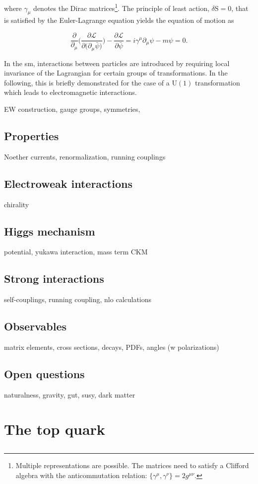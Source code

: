 where $\gamma_\mu$ denotes the Dirac matrices\footnote{Multiple representations are possible. The matrices need to satisfy a Clifford algebra with the anticommutation relation: $\big\{\gamma^\mu,\gamma^\nu\big\}=2g^{\mu\nu}$.}. The principle of least action, $\delta \mathrm{S}=0$, that is satisfied by the Euler-Lagrange equation yields the equation of motion as

\begin{equation}
\frac{\partial}{\partial_\mu}\Bigg(\frac{\partial\mathcal{L}}{\partial\big(\partial_\mu\bar{\psi}\big)}\Bigg)-\frac{\partial\mathcal{L}}{\partial\bar{\psi}}=i\gamma^\mu\partial_\mu\psi-m\psi=0.
\end{equation}


In the \gls{sm}, interactions between particles are introduced by requiring local invariance of the Lagrangian for certain groups of transformations. In the following, this is briefly demonstrated for the case of a $\mathrm{U(1)}$ transformation which leads to electromagnetic interactions.


EW construction, gauge groups, symmetries, 

\subsection{Properties}


Noether currents, renormalization, running couplings


\subsection{Electroweak interactions}
\label{sec:theory-ewk}
chirality
\subsection{Higgs mechanism}
potential, yukawa interaction, mass term CKM
\subsection{Strong interactions}
\label{sec:theory-qcd}
self-couplings, running coupling, nlo calculations
\subsection{Observables}
matrix elements, cross sections, decays, PDFs, angles (w polarizations)
\subsection{Open questions}
naturalness, gravity, gut, susy, dark matter

\section{The top quark}
\subsection{}
